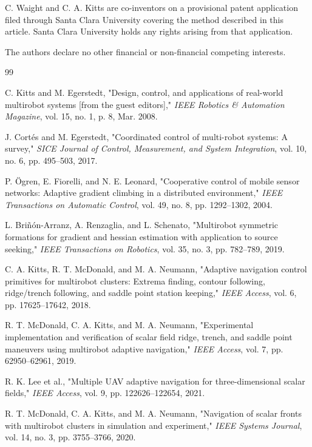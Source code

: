 \documentclass[lettersize,journal]{IEEEtran}
\providecommand{\DIFdelbegin}{\protect\color{DIFdeltx}} %
\providecommand{\DIFdelend}{\protect\color{black}} %
\providecommand{\DIFscaledelfig}{0.5} %
\newlength{\DIFdelgraphicswidth} %
\newlength{\DIFdelgraphicsheight} %
\providecommand{\DIFdelincludegraphics}[2][]{%
\sbox{\DIFdelgraphicsbox}{\DIFOincludegraphics[#1]{#2}}%
\settoboxwidth{\DIFdelgraphicswidth}{\DIFdelgraphicsbox} %
\settoboxtotalheight{\DIFdelgraphicsheight}{\DIFdelgraphicsbox} %
\scalebox{\DIFscaledelfig}{%
\parbox[b]{\DIFdelgraphicswidth}{\usebox{\DIFdelgraphicsbox}\\[-\baselineskip] \rule{\DIFdelgraphicswidth}{0em}}\llap{\resizebox{\DIFdelgraphicswidth}{\DIFdelgraphicsheight}{%
\setlength{\unitlength}{\DIFdelgraphicswidth}%
\begin{picture}(1,1)%
\thicklines\linethickness{2pt} %
{\color{DIFdeltx}\put(0,0){\framebox(1,1){}}}%
{\color{DIFdeltx}\put(0,0){\line( 1,1){1}}}%
{\color{DIFdeltx}\put(0,1){\line(1,-1){1}}}%
\end{picture}%
}\hspace*{3pt}}} %
} %
\DeclareRobustCommand{\DIFdelbegin}{\DIFOdelbegin \let\includegraphics\DIFdelincludegraphics} %
\DeclareRobustCommand{\DIFdelend}{\DIFOdelend \let\includegraphics\DIFOincludegraphics} %
\begin{document}
C. Waight and C. A. Kitts are co-inventors on a provisional patent application filed through Santa Clara University covering the method described in this article. Santa Clara University holds any rights arising from that application.

The authors declare no other financial or non-financial competing interests.


\DIFdelbegin %
\DIFdelend \begin{thebibliography}{99}

 C. Kitts and M. Egerstedt, "Design, control, and applications of real-world multirobot systems [from the guest editors]," \textit{IEEE Robotics \& Automation Magazine}, vol. 15, no. 1, p. 8, Mar. 2008.

 J. Cortés and M. Egerstedt, "Coordinated control of multi-robot systems: A survey," \textit{SICE Journal of Control, Measurement, and System Integration}, vol. 10, no. 6, pp. 495--503, 2017.

 P. Ögren, E. Fiorelli, and N. E. Leonard, "Cooperative control of mobile sensor networks: Adaptive gradient climbing in a distributed environment," \textit{IEEE Transactions on Automatic Control}, vol. 49, no. 8, pp. 1292--1302, 2004.

 L. Briñón-Arranz, A. Renzaglia, and L. Schenato, "Multirobot symmetric formations for gradient and hessian estimation with application to source seeking," \textit{IEEE Transactions on Robotics}, vol. 35, no. 3, pp. 782--789, 2019.

 C. A. Kitts, R. T. McDonald, and M. A. Neumann, "Adaptive navigation control primitives for multirobot clusters: Extrema finding, contour following, ridge/trench following, and saddle point station keeping," \textit{IEEE Access}, vol. 6, pp. 17625--17642, 2018.

 R. T. McDonald, C. A. Kitts, and M. A. Neumann, "Experimental implementation and verification of scalar field ridge, trench, and saddle point maneuvers using multirobot adaptive navigation," \textit{IEEE Access}, vol. 7, pp. 62950--62961, 2019.

 R. K. Lee et al., "Multiple UAV adaptive navigation for three-dimensional scalar fields," \textit{IEEE Access}, vol. 9, pp. 122626--122654, 2021.

 R. T. McDonald, C. A. Kitts, and M. A. Neumann, "Navigation of scalar fronts with multirobot clusters in simulation and experiment," \textit{IEEE Systems Journal}, vol. 14, no. 3, pp. 3755--3766, 2020.


\end{thebibliography}
\end{document}
